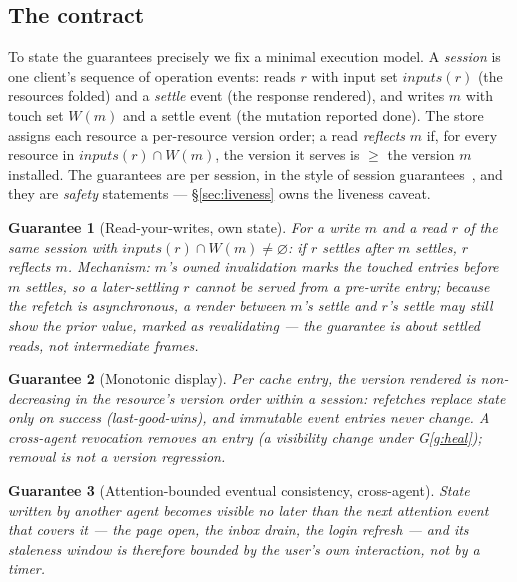 \documentclass[11pt,a4paper]{article}
\newtheorem{guarantee}{Guarantee}[section]
\theoremstyle{remark}
\begin{document}
\subsection{The contract}\label{sec:contract}

To state the guarantees precisely we fix a minimal execution model. A
\emph{session} is one client's sequence of operation events: reads $r$ with
input set $\mathit{inputs}(r)$ (the resources folded) and a \emph{settle}
event (the response rendered), and writes $m$ with touch set $W(m)$ and a
settle event (the mutation reported done). The store assigns each resource a
per-resource version order; a read \emph{reflects} $m$ if, for every resource
in $\mathit{inputs}(r) \cap W(m)$, the version it serves is $\ge$ the version
$m$ installed. The guarantees are per session, in the style of session
guarantees~\cite{terry1994}, and they are \emph{safety} statements ---
\S\ref{sec:liveness} owns the liveness caveat.

\begin{guarantee}[Read-your-writes, own state]\label{g:ryw}
For a write $m$ and a read $r$ of the same session with
$\mathit{inputs}(r) \cap W(m) \neq \varnothing$: if $r$ \emph{settles} after
$m$ settles, $r$ reflects $m$. Mechanism: $m$'s owned invalidation marks the
touched entries before $m$ settles, so a later-settling $r$ cannot be served
from a pre-write entry; because the refetch is asynchronous, a render
\emph{between} $m$'s settle and $r$'s settle may still show the prior value,
marked as revalidating --- the guarantee is about settled reads, not
intermediate frames.
\end{guarantee}

\begin{guarantee}[Monotonic display]\label{g:monotonic}
Per cache entry, the version rendered is non-decreasing in the resource's
version order within a session: refetches replace state only on success
(last-good-wins), and immutable event entries never change. A cross-agent
revocation \emph{removes} an entry (a visibility change under
G\ref{g:heal}); removal is not a version regression.
\end{guarantee}

\begin{guarantee}[Attention-bounded eventual consistency, cross-agent]\label{g:eventual}
State written by another agent becomes visible no later than the next attention
event that covers it --- the page open, the inbox drain, the login refresh ---
and its staleness window is therefore bounded by the user's own interaction,
not by a timer.
\end{guarantee}
\end{document}
